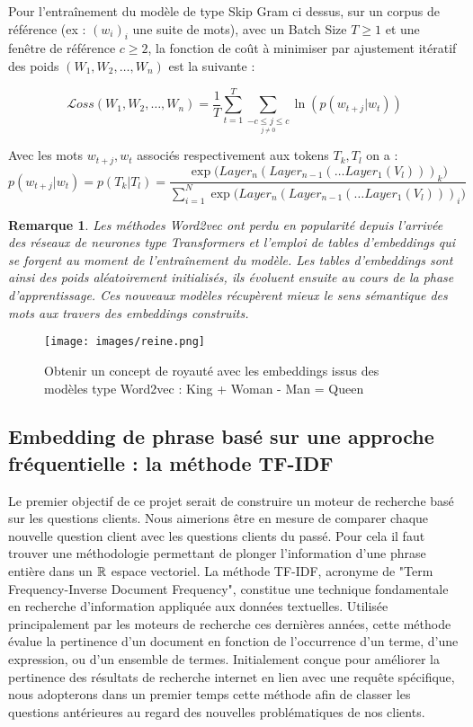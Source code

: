 \documentclass[12pt]{article}
\newtheorem{rmq}{Remarque}
\theoremstyle{definition}
\begin{document}
	Pour l'entraînement du modèle de type Skip Gram ci dessus, sur un corpus  de référence (ex : $(w_i)_i$ une suite de mots), avec un Batch Size  $T \geq 1$ et une fenêtre de référence $c\geq2$, la fonction de coût à minimiser par ajustement itératif des poids $(W_1,W_2,\dots,W_n)$ est la suivante :  
	
	$$\displaystyle\mathcal{L}oss(W_1,W_2,\dots,W_n) = \dfrac{1}{T}\sum_{t=1}^{T}\sum_{\underset{j\neq 0}{-c\leq j \leq c}} \ln(p(w_{t+j}|w_t))$$
	
	\noindent Avec les mots $w_{t+j}, w_{t}$ associés respectivement aux tokens $T_k, T_l$ on a :
	 $$ p(w_{t+j}|w_t) = p(T_k|T_l) = \dfrac{\displaystyle\exp\big(Layer_n(Layer_{n-1}(\dots Layer_1(V_l)))_k\big)}{\displaystyle\sum_{i=1}^{N}\exp\big(Layer_n(Layer_{n-1}(\dots Layer_1(V_l)))_i\big)}$$
	
	
	\begin{rmq}
		Les méthodes Word2vec ont perdu en popularité depuis l'arrivée des réseaux de neurones type Transformers et l'emploi de tables d'embeddings qui se forgent au moment de l'entraînement du modèle. Les tables d'embeddings sont ainsi des poids aléatoirement initialisés, ils évoluent ensuite au cours de la phase d'apprentissage. Ces nouveaux modèles récupèrent mieux le sens sémantique des mots aux travers des embeddings construits. 
	\end{rmq}

		\begin{figure*}[!h]
		\centering
		\texttt{[image: images/reine.png]}
		\caption{Obtenir un concept de royauté avec les embeddings issus des modèles type Word2vec : King + Woman - Man = Queen \cite{Distributed_Representations_of_Words} }
	\end{figure*}
	
	
	\subsection{Embedding de phrase basé sur une approche fréquentielle : la méthode TF-IDF}
	
	Le premier objectif de ce projet serait de construire un moteur de recherche basé sur les questions clients. Nous aimerions être en mesure de comparer chaque nouvelle question client avec les questions clients du passé. Pour cela il faut trouver une méthodologie permettant de plonger l'information d'une phrase entière dans un $\mathbb{R}$ espace vectoriel. La méthode TF-IDF, acronyme de "Term Frequency-Inverse Document Frequency", constitue une technique fondamentale en recherche d'information appliquée aux données textuelles. Utilisée principalement par les moteurs de recherche ces dernières années, cette méthode évalue la pertinence d'un document en fonction de l'occurrence d'un terme, d'une expression, ou d'un ensemble de termes. Initialement conçue pour améliorer la pertinence des résultats de recherche internet en lien avec une requête spécifique, nous adopterons dans un premier temps cette méthode afin de classer les questions antérieures au regard des nouvelles problématiques de nos clients.\\
	
\end{document}
